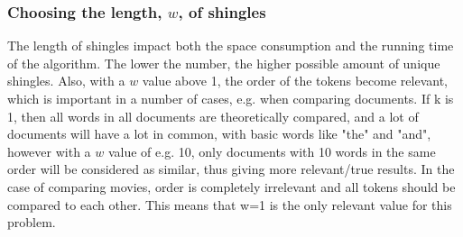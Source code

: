 \subsubsection{Choosing the length, \(w\), of shingles}
The length of shingles impact both the space consumption and the running time of the algorithm. The lower the number, the higher possible amount of unique shingles. Also, with a \(w\) value above 1, the order of the tokens become relevant, which is important in a number of cases, e.g. when comparing documents. If k is 1, then all words in all documents are theoretically compared, and a lot of documents will have a lot in common, with basic words like "the" and "and", however with a \(w\) value of e.g. 10, only documents with 10 words in the same order will be considered as similar, thus giving more relevant/true results. In the case of comparing movies, order is completely irrelevant and all tokens should be compared to each other. This means that w=1 is the only relevant value for this problem.